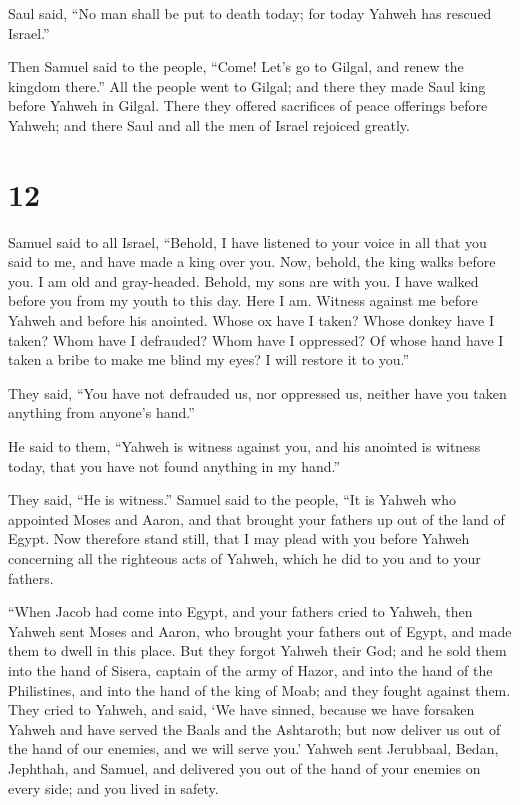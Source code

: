  Saul said, ``No man shall be put to death today; for today
Yahweh has rescued Israel.''

 Then Samuel said to the people, ``Come! Let's go to
Gilgal, and renew the kingdom there.''  All the people went
to Gilgal; and there they made Saul king before Yahweh in Gilgal. There
they offered sacrifices of peace offerings before Yahweh; and there Saul
and all the men of Israel rejoiced greatly.

\hypertarget{section-11}{%
\section{12}\label{section-11}}

 Samuel said to all Israel, ``Behold, I have listened to
your voice in all that you said to me, and have made a king over you.
 Now, behold, the king walks before you. I am old and
gray-headed. Behold, my sons are with you. I have walked before you from
my youth to this day.  Here I am. Witness against me before
Yahweh and before his anointed. Whose ox have I taken? Whose donkey have
I taken? Whom have I defrauded? Whom have I oppressed? Of whose hand
have I taken a bribe to make me blind my eyes? I will restore it to
you.''

 They said, ``You have not defrauded us, nor oppressed us,
neither have you taken anything from anyone's hand.''

 He said to them, ``Yahweh is witness against you, and his
anointed is witness today, that you have not found anything in my
hand.''

They said, ``He is witness.''  Samuel said to the people,
``It is Yahweh who appointed Moses and Aaron, and that brought your
fathers up out of the land of Egypt.  Now therefore stand
still, that I may plead with you before Yahweh concerning all the
righteous acts of Yahweh, which he did to you and to your fathers.

 ``When Jacob had come into Egypt, and your fathers cried to
Yahweh, then Yahweh sent Moses and Aaron, who brought your fathers out
of Egypt, and made them to dwell in this place.  But they
forgot Yahweh their God; and he sold them into the hand of Sisera,
captain of the army of Hazor, and into the hand of the Philistines, and
into the hand of the king of Moab; and they fought against them.
 They cried to Yahweh, and said, `We have sinned, because
we have forsaken Yahweh and have served the Baals and the Ashtaroth; but
now deliver us out of the hand of our enemies, and we will serve you.'
 Yahweh sent Jerubbaal, Bedan, Jephthah, and Samuel, and
delivered you out of the hand of your enemies on every side; and you
lived in safety.

